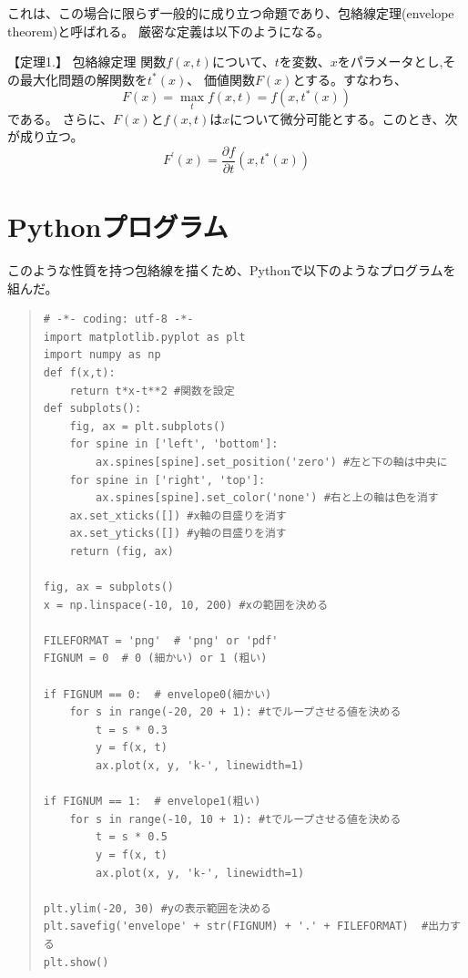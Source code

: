 \documentclass[11pt,a4j,fleqn]{jarticle}
\begin{document}
\vspace{0.3cm}

これは、この場合に限らず一般的に成り立つ命題であり、包絡線定理(envelope theorem)と呼ばれる。
厳密な定義は以下のようになる。

\vspace{0.3cm}

\begin{itembox}[1]{ \Large 【定理1.】  包絡線定理}
 関数$f(x , t) $について、$t$を変数、$x$をパラメータとし,その最大化問題の解関数を$t^*(x)$、
 価値関数$F(x)$とする。すなわち、
 \[F(x) = \max_{t} {f(x,t)} = f(x , t^*(x))\]
 である。
 さらに、$F(x)$と$f(x,t)$は$x$について微分可能とする。このとき、次が成り立つ。
 \begin{equation}
  F^{'}(x) = \frac{\partial f}{\partial t} (x , t^*(x))
 \end{equation}
\end{itembox}

\vspace{0.3cm}

\newpage

\section{Pythonプログラム}

このような性質を持つ包絡線を描くため、Pythonで以下のようなプログラムを組んだ。

\begin{quote}
\begin{verbatim}
# -*- coding: utf-8 -*-
import matplotlib.pyplot as plt
import numpy as np
def f(x,t):
    return t*x-t**2 #関数を設定
def subplots():
    fig, ax = plt.subplots()
    for spine in ['left', 'bottom']:
        ax.spines[spine].set_position('zero') #左と下の軸は中央に
    for spine in ['right', 'top']:
        ax.spines[spine].set_color('none') #右と上の軸は色を消す
    ax.set_xticks([]) #x軸の目盛りを消す
    ax.set_yticks([]) #y軸の目盛りを消す
    return (fig, ax)

fig, ax = subplots()
x = np.linspace(-10, 10, 200) #xの範囲を決める

FILEFORMAT = 'png'  # 'png' or 'pdf'
FIGNUM = 0  # 0 (細かい) or 1 (粗い)

if FIGNUM == 0:  # envelope0(細かい)
    for s in range(-20, 20 + 1): #tでループさせる値を決める
        t = s * 0.3
        y = f(x, t)
        ax.plot(x, y, 'k-', linewidth=1)

if FIGNUM == 1:  # envelope1(粗い)
    for s in range(-10, 10 + 1): #tでループさせる値を決める
        t = s * 0.5
        y = f(x, t)
        ax.plot(x, y, 'k-', linewidth=1)

plt.ylim(-20, 30) #yの表示範囲を決める
plt.savefig('envelope' + str(FIGNUM) + '.' + FILEFORMAT)  #出力する
plt.show()
\end{verbatim}
\end{quote}
\end{document}
